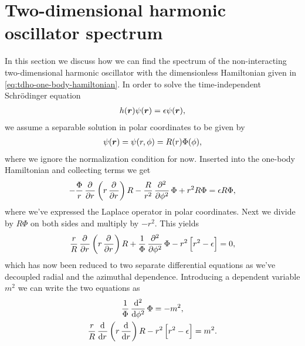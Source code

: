     \section{Two-dimensional harmonic oscillator spectrum}
        \label{app:tdho-spectrum}
        In this section we discuss how we can find the spectrum of the
        non-interacting two-dimensional harmonic oscillator with the
        dimensionless Hamiltonian given in
        \autoref{eq:tdho-one-body-hamiltonian}.
        In order to solve the time-independent Schrödinger equation
        \begin{align}
            h(\boldsymbol{r})\psi(\boldsymbol{r}) = \epsilon \psi(\boldsymbol{r}),
        \end{align}
        we assume a separable solution in polar coordinates to be given by
        \begin{align}
            \psi(\boldsymbol{r}) = \psi(r, \phi)
            = R(r)\Phi(\phi),
        \end{align}
        where we ignore the normalization condition for now.
        Inserted into the one-body Hamiltonian and collecting terms we get
        \begin{gather}
            -\frac{\Phi}{r}\dpd{}{r}\para{
                r\dpd{}{r}
            }R
            - \frac{R}{r^2}\dpd[2]{}{\phi}\Phi
            + r^2 R \Phi = \epsilon R \Phi,
        \end{gather}
        where we've expressed the Laplace operator in polar coordinates.
        Next we divide by $R\Phi$ on both sides and multiply by $-r^2$.
        This yields
        \begin{gather}
            \frac{r}{R}\dpd{}{r}\para{
                r\dpd{}{r}
            } R
            + \frac{1}{\Phi}
            \dpd[2]{}{\phi}
            \Phi
            - r^2\brak{
                r^2 - \epsilon
            }
            = 0,
        \end{gather}
        which has now been reduced to two separate differential equations as
        we've decoupled radial and the azimuthal dependence.
        Introducing a dependent variable $m^2$ we can write the two equations
        as
        \begin{gather}
            \frac{1}{\Phi}\dod[2]{}{\phi}\Phi = -m^2,
            \label{eq:tdho-angular-eq}
            \\
            \frac{r}{R}\dod{}{r}\para{
                r\dod{}{r}
            }R
            - r^2 \brak{
                r^2 - \epsilon
            }
            = m^2.
            \label{eq:tdho-radial-eq}
        \end{gather}
